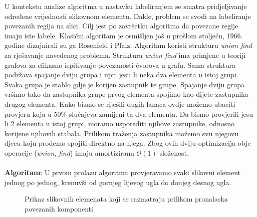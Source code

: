 \documentclass[times, utf8, diplomski]{fer}
\theoremstyle{definition}
\begin{document}
U kontekstu analize algoritma u nastavku labeliranjem se smatra pridjeljivanje određene vrijednosti slikovnom elementu. Dakle, problem se svodi na labeliranje povezanih regija na slici. Cilj jest po završetku algoritma da povezane regije imaju iste labele. Klasični algoritam je osmišljen još u prošlom stoljeću, 1966. godine dizajnirali su ga Rosenfeld i Pfalz. Algoritam koristi strukturu \textit{union find} za rješavanje navedenog problema. Struktura \textit{union find} ima primjene u teoriji grafova za efikasno ispitivanje povezanosti čvorova u grafu. Sama struktura podržava spajanje dviju grupa i upit jesu li neka dva elementa u istoj grupi. Svaka grupa je stablo gdje je korijen zastupnik te grupe. Spajanje dviju grupa vršimo tako da zastupnika grupe prvog elementa spojimo kao dijete zastupnika drugog elementa. Kako bismo se riješili dugih lanaca ovdje možemo ubaciti provjeru koja u $50\%$ slučajeva zamijeni ta dva elementa. Da bismo provjerili jesu li 2 elementa u istoj grupi, moramo usporediti njihove zastupnike, odnosno korijene njihovih stabala. Prilikom traženja zastupnika možemo svu njegovu djecu koju prođemo spojiti direktno na njega. Zbog ovih dviju optimizacija obje operacije (\textit{union}, \textit{find}) imaju amortiziranu $\mathcal{O}(1)$ složenost.
\\
\\
\textbf{Algoritam}:
U prvom prolazu algoritma provjeravamo svaki slikovni element jednog po jednog, krenuvši od gornjeg lijevog ugla do donjeg desnog ugla.
\begin{figure}[h]
	\begin{center}
	\end{center}
\caption{Prikaz slikovnih elemenata koji se razmatraju prilikom pronalaska povezanih komponenti}
\end{figure}
\end{document}
